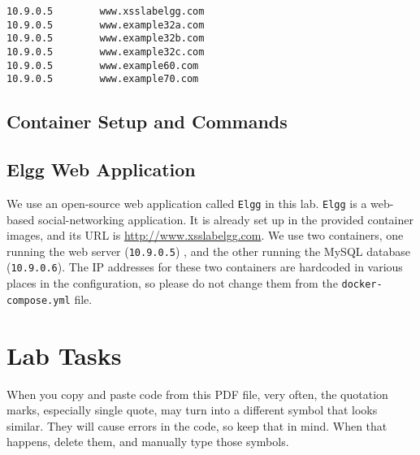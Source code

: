\begin{lstlisting}
10.9.0.5        www.xsslabelgg.com
10.9.0.5        www.example32a.com
10.9.0.5        www.example32b.com
10.9.0.5        www.example32c.com
10.9.0.5        www.example60.com
10.9.0.5        www.example70.com
\end{lstlisting}
 

\subsection{Container Setup and Commands}





\subsection{Elgg Web Application}

We use an open-source web application called {\tt Elgg} in this lab.
{\tt Elgg} is a web-based social-networking application.
It is already set up in the provided container images, 
and its URL is \url{http://www.xsslabelgg.com}.
We use two containers, one running the web server (\texttt{10.9.0.5}) ,
and the other running the MySQL database (\texttt{10.9.0.6}). 
The IP addresses for these two containers are hardcoded in various 
places in the configuration, so please do not change them from
the \texttt{docker-compose.yml} file. 








\section{Lab Tasks}

When you copy and paste code from this PDF file, very often, the 
quotation marks, especially single quote, may turn into 
a different symbol that looks similar. They will cause 
errors in the code, so keep that in mind. When that happens,
delete them, and manually type those symbols.



